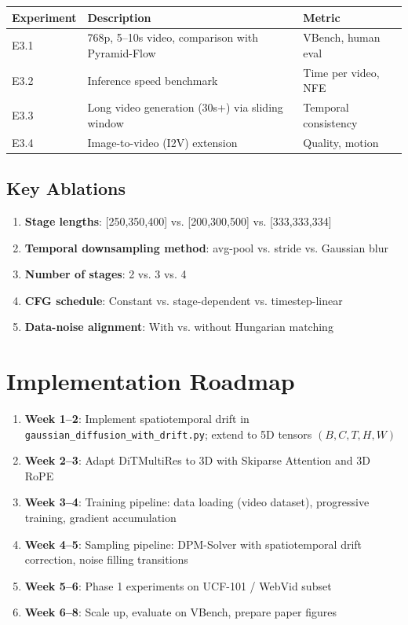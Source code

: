 \documentclass[11pt,a4paper]{article}
\begin{document}
\begin{table}[h]
\centering
\begin{tabular}{lll}
\toprule
Experiment & Description & Metric \\
\midrule
E3.1 & 768p, 5--10s video, comparison with Pyramid-Flow & VBench, human eval \\
E3.2 & Inference speed benchmark & Time per video, NFE \\
E3.3 & Long video generation (30s+) via sliding window & Temporal consistency \\
E3.4 & Image-to-video (I2V) extension & Quality, motion \\
\bottomrule
\end{tabular}
\end{table}

\subsection{Key Ablations}

\begin{enumerate}[nosep]
\item \textbf{Stage lengths}: [250,350,400] vs. [200,300,500] vs. [333,333,334]
\item \textbf{Temporal downsampling method}: avg-pool vs. stride vs. Gaussian blur
\item \textbf{Number of stages}: 2 vs. 3 vs. 4
\item \textbf{CFG schedule}: Constant vs. stage-dependent vs. timestep-linear
\item \textbf{Data-noise alignment}: With vs. without Hungarian matching
\end{enumerate}

\section{Implementation Roadmap}

\begin{enumerate}[nosep]
\item \textbf{Week 1--2}: Implement spatiotemporal drift in \texttt{gaussian\_diffusion\_with\_drift.py}; extend to 5D tensors $(B,C,T,H,W)$
\item \textbf{Week 2--3}: Adapt DiTMultiRes to 3D with Skiparse Attention and 3D RoPE
\item \textbf{Week 3--4}: Training pipeline: data loading (video dataset), progressive training, gradient accumulation
\item \textbf{Week 4--5}: Sampling pipeline: DPM-Solver with spatiotemporal drift correction, noise filling transitions
\item \textbf{Week 5--6}: Phase 1 experiments on UCF-101 / WebVid subset
\item \textbf{Week 6--8}: Scale up, evaluate on VBench, prepare paper figures
\end{enumerate}
\end{document}
